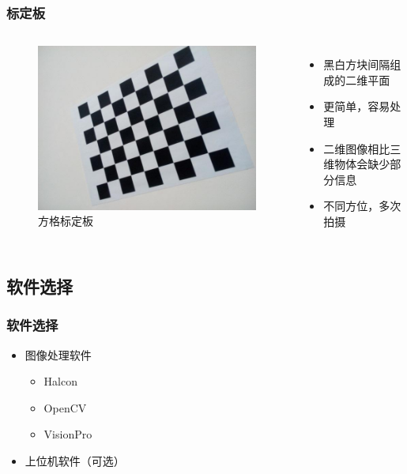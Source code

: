 \documentclass[aspectratio=43]{beamer}
\begin{document}
\begin{frame}
	\frametitle{标定板}
	\begin{columns}
	\column{5cm}
	\begin{figure}\label{标定板}
	\begin{center}
		\includegraphics[scale=0.25]{标定板}
		\caption{方格标定板}
	\end{center}
	\end{figure}
	\column{5cm}
	\begin{itemize}
		\item 黑白方块间隔组成的二维平面
		\item 更简单，容易处理
		\item 二维图像相比三维物体会缺少部分信息
		\item 不同方位，多次拍摄
	\end{itemize}	
	\end{columns}
		
\end{frame}	






\subsection{软件选择}


\begin{frame}
	\frametitle{软件选择}
	\begin{itemize}
		\item 图像处理软件
		\begin{itemize}
			\item Halcon
			\item OpenCV
			\item VisionPro
		\end{itemize}
		\item 上位机软件（可选）
	\end{itemize}
\end{frame}
\end{document}
